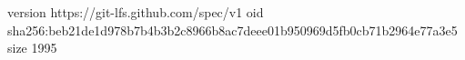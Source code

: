 version https://git-lfs.github.com/spec/v1
oid sha256:beb21de1d978b7b4b3b2c8966b8ac7deee01b950969d5fb0cb71b2964e77a3e5
size 1995
